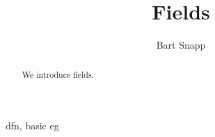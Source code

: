 \documentclass{ximera}
\author{Bart Snapp}
\title{Fields}
\begin{document}
\begin{abstract}
  We introduce fields.
\end{abstract}
\maketitle

dfn, basic eg
\end{document}
